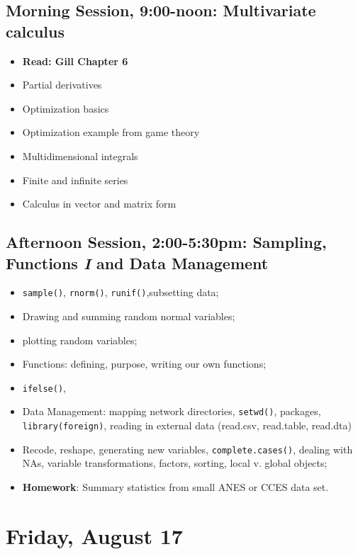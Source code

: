 \documentclass[12pt,a4paper]{article}
\begin{document}
\subsection*{Morning Session, 9:00-noon: Multivariate calculus}
\begin{itemize}
\setlength{\itemsep}{0pt}
\footnotesize
\item \textbf{Read: Gill Chapter 6}
\item Partial derivatives
\item Optimization basics
\item Optimization example from game theory
\item Multidimensional integrals
\item Finite and infinite series
\item Calculus in vector and matrix form


\end{itemize}

\subsection*{Afternoon Session, 2:00-5:30pm: Sampling, Functions \emph{I} and Data Management}
\begin{itemize}
\setlength{\itemsep}{0pt}
\footnotesize
\item \texttt{sample()}, \texttt{rnorm()}, \texttt{runif()},subsetting data;
\item Drawing and summing random normal variables;
\item plotting random variables;
\item Functions: defining, purpose, writing our own functions;
\item \texttt{ifelse()},
\item Data Management: mapping network directories, \texttt{setwd()}, packages, \texttt{library(foreign)}, reading in external data (read.csv, read.table, read.dta)
\item Recode, reshape, generating new variables, \texttt{complete.cases()}, dealing with NAs, variable transformations, factors, sorting, local v. global objects;
\item \textbf{Homework}: Summary statistics from small ANES or CCES data set.
\end{itemize}



\section*{Friday, August 17}
\end{document}
